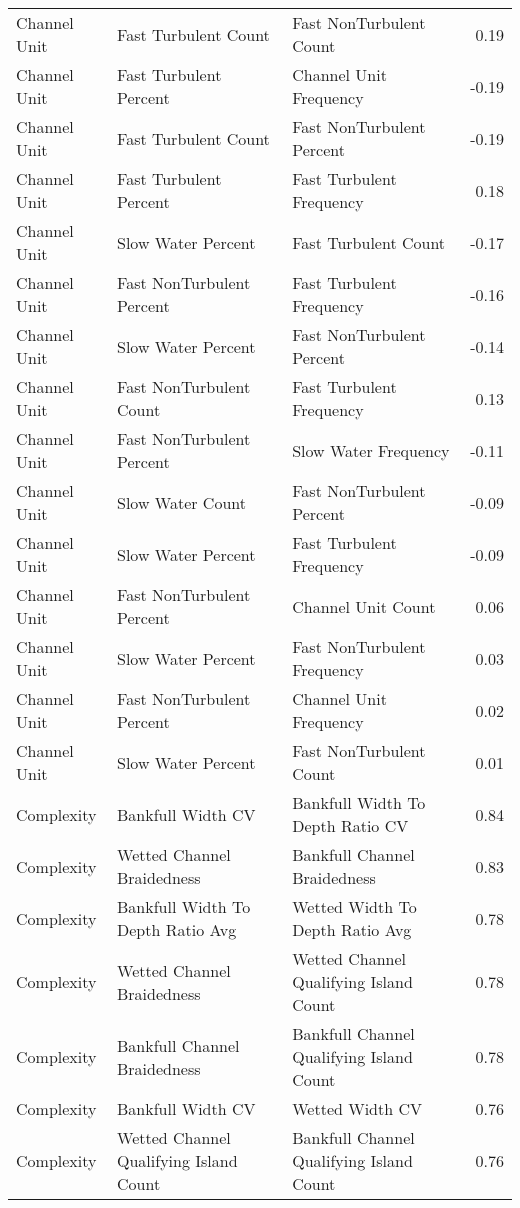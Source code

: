 \documentclass[
  12pt,
]{article}
\begin{document}
\begin{longtable}[t]{>{\raggedright\arraybackslash}p{1in}>{\raggedright\arraybackslash}p{2in}>{\raggedright\arraybackslash}p{2in}r}
\addlinespace
Channel Unit & Fast Turbulent Count & Fast NonTurbulent Count & 0.19\\
Channel Unit & Fast Turbulent Percent & Channel Unit Frequency & -0.19\\
Channel Unit & Fast Turbulent Count & Fast NonTurbulent Percent & -0.19\\
Channel Unit & Fast Turbulent Percent & Fast Turbulent Frequency & 0.18\\
Channel Unit & Slow Water Percent & Fast Turbulent Count & -0.17\\
\addlinespace
Channel Unit & Fast NonTurbulent Percent & Fast Turbulent Frequency & -0.16\\
Channel Unit & Slow Water Percent & Fast NonTurbulent Percent & -0.14\\
Channel Unit & Fast NonTurbulent Count & Fast Turbulent Frequency & 0.13\\
Channel Unit & Fast NonTurbulent Percent & Slow Water Frequency & -0.11\\
Channel Unit & Slow Water Count & Fast NonTurbulent Percent & -0.09\\
\addlinespace
Channel Unit & Slow Water Percent & Fast Turbulent Frequency & -0.09\\
Channel Unit & Fast NonTurbulent Percent & Channel Unit Count & 0.06\\
Channel Unit & Slow Water Percent & Fast NonTurbulent Frequency & 0.03\\
Channel Unit & Fast NonTurbulent Percent & Channel Unit Frequency & 0.02\\
Channel Unit & Slow Water Percent & Fast NonTurbulent Count & 0.01\\
\hline
\addlinespace
Complexity & Bankfull Width CV & Bankfull Width To Depth Ratio CV & 0.84\\
Complexity & Wetted Channel Braidedness & Bankfull Channel Braidedness & 0.83\\
Complexity & Bankfull Width To Depth Ratio Avg & Wetted Width To Depth Ratio Avg & 0.78\\
Complexity & Wetted Channel Braidedness & Wetted Channel Qualifying Island Count & 0.78\\
Complexity & Bankfull Channel Braidedness & Bankfull Channel Qualifying Island Count & 0.78\\
\addlinespace
Complexity & Bankfull Width CV & Wetted Width CV & 0.76\\
Complexity & Wetted Channel Qualifying Island Count & Bankfull Channel Qualifying Island Count & 0.76\\

\end{longtable}
\end{document}
